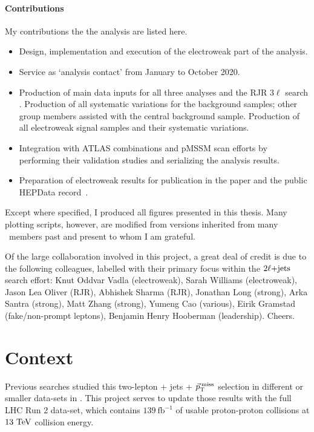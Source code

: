 \paragraph{Contributions}
My contributions the the analysis are listed here.
\begin{itemize}
\item Design, implementation and execution of the electroweak part of the analysis.
\item Service as `analysis contact' from January to October 2020.
\item Production of main data inputs for all three analyses
and the RJR $3\ell$ search .
Production of all systematic variations for the background samples;
other group members assisted with the central background sample.
Production of all electroweak signal samples and their systematic variations.
\item Integration with ATLAS combinations and pMSSM scan efforts by
performing their validation studies and serializing the analysis results.
\item Preparation of electroweak results for publication in the paper  and the
public HEPData record~\cite{maguire2017hepdata}.
\end{itemize}
Except where specified, I produced all figures presented in this thesis.
Many plotting scripts, however, are modified from versions inherited from
many \atlas\ members past and present to whom I am grateful.

Of the large collaboration involved in this project, a great deal of credit is
due to the following colleagues, labelled with their primary focus within
the $\twoljets$ search effort:
Knut Oddvar Vadla (electroweak),
Sarah Williams (electroweak),
Jason Lea Oliver (RJR),
Abhishek Sharma (RJR),
Jonathan Long (strong),
Arka Santra (strong),
Matt Zhang (strong),
Yumeng Cao (various),
Eirik Gramstad (fake/non-prompt leptons),
Benjamin Henry Hooberman (leadership).
Cheers.

\clearpage
\FloatBarrier
\section{Context}
Previous searches studied this two-lepton + jets + $\ptmiss$ selection
in different or smaller data-sets in \atlas.
This project serves to update those results with the full LHC Run 2 data-set,
which contains $139~\mathrm{fb}^{-1}$ of usable proton-proton collisions at
$13~\eV[T]$ collision energy.


